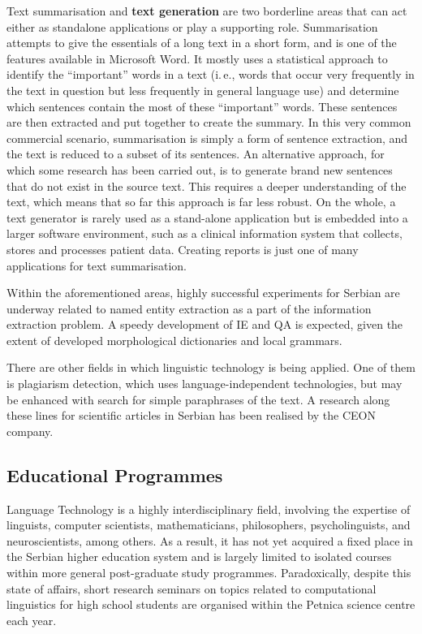\begin{multicols}{2}


Text summarisation and \textbf{text generation} are two borderline areas that can act either as standalone applications or play a supporting role. Summarisation attempts to give the essentials of a long text in a short form, and is one of the features available in Microsoft Word. It mostly uses a statistical approach to identify the “important” words in a text (i.\,e., words that occur very frequently in the text in question but less frequently in general language use) and determine which sentences contain the most of these “important” words. These sentences are then extracted and put together to create the summary. In this very common commercial scenario, summarisation is simply a form of sentence extraction, and the text is reduced to a subset of its sentences. An alternative approach, for which some research has been carried out, is to generate brand new sentences that do not exist in the source text. This requires a deeper understanding of the text, which means that so far this approach is far less robust. On the whole, a text generator is rarely used as a stand-alone application but is embedded into a larger software environment, such as a clinical information system that collects, stores and processes patient data. Creating reports is just one of many applications for text summarisation.


Within the aforementioned areas, highly successful experiments for Serbian are underway related to named entity extraction as a part of the information extraction problem. A speedy development of IE and QA is expected, given the extent of developed morphological dictionaries and local grammars.

There are other fields in which linguistic technology is being applied. One of them is plagiarism detection, which uses language-independent technologies, but may be enhanced with search for simple paraphrases of the text. A research along these lines for scientific articles in Serbian has been realised by the CEON company. \cite{CEON}
 \subsection {Educational Programmes}

Language Technology is a highly interdisciplinary field, involving the expertise of linguists, computer scientists, mathematicians, philosophers, psycholinguists, and neuroscientists, among others. As a result, it has not yet acquired a fixed place in the Serbian higher education system and is largely limited to isolated courses within more general post-graduate study programmes. Paradoxically, despite this state of affairs, short research seminars on topics related to computational linguistics for high school students are organised within the Petnica science centre \cite{PETNICA} each year. 


\end{multicols}
